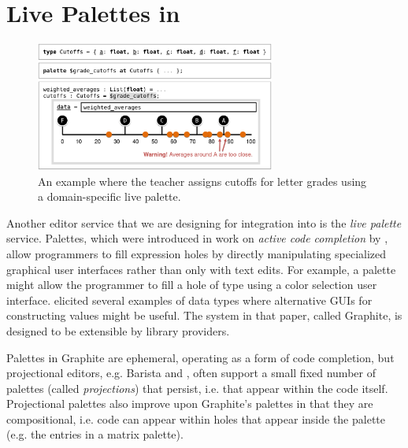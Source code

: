 
\section{Live Palettes in \Hazel}
\label{sec:palettes}


\begin{figure}[t]
\vspace{-4px}
\includegraphics[width=0.7\textwidth]{images/cutoffs-new-elided.png}
\caption{An example where the teacher assigns cutoffs 
for letter grades using a domain-specific live palette.}
\label{fig:cutoffs-example}
\vspace{-7px}
\end{figure}

Another editor service that we are designing for integration into \Hazel 
is the \emph{live palette} service.
Palettes, which were introduced in work on
\emph{active code completion} by \citet{ActiveCodeCompletion},  allow programmers to fill expression
holes by directly manipulating specialized graphical user interfaces rather than only with text edits. For example, a palette might allow the programmer to 
fill a hole of type  using a color selection  
user interface.
\citet{ActiveCodeCompletion} elicited several examples of data types where alternative GUIs
for constructing values might be useful.
The system in that paper, called {Graphite}, is designed to be extensible by library providers. 

Palettes in {Graphite} 
are ephemeral, operating as a form of code completion, but projectional editors, e.g. Barista \cite{ko_barista:_2006} and  \cite{voelter_mbeddr:_2012}, often support a small fixed number of  
palettes (called \emph{projections}) that persist, i.e. that appear within the code itself. 
Projectional palettes also improve upon Graphite's palettes in that they are compositional, i.e. code can appear within holes that appear inside the palette (e.g. the entries in a matrix palette). 

